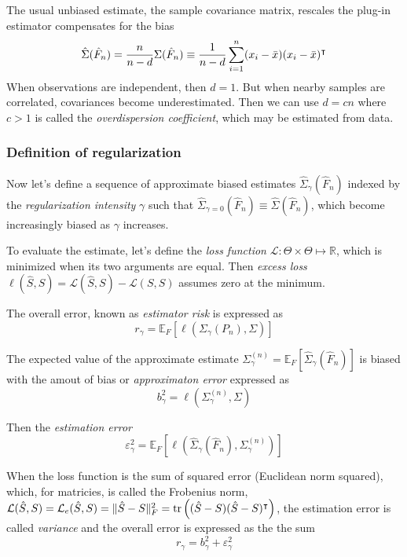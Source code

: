The usual unbiased estimate, the sample covariance matrix, rescales the plug-in estimator compensates for the bias
\begin{equation}
\hat\Sigma(\hat F_n) = \frac n {n - d} \Sigma(\hat F_n) \equiv \frac 1 {n-d} \sum\limits_{i=1}^n (x_i - \bar x) (x_i - \bar x)^\intercal
\end{equation}
When observations are independent, then $d=1$.  But when nearby samples are correlated, covariances become underestimated. Then we can use $d=cn$ where $c>1$ is called the \emph{overdispersion coefficient}, which may be estimated from data.

\subsubsection{Definition of regularization}
Now let's define a sequence of approximate biased estimates $\hat\Sigma_\gamma(\hat F_n)$ indexed by the \emph{regularization intensity}  $\gamma$ such that $\hat\Sigma_{\gamma=0}(\hat F_n)\equiv \hat\Sigma(\hat F_n)$, which become increasingly biased as $\gamma$ increases.

To evaluate the estimate, let's define the \emph{loss function} $\mathcal L : \Theta \times \Theta \mapsto \mathbb R$, which is minimized when its two arguments are equal.  Then \emph{excess loss} $\ell(\hat S, S) = \mathcal L(\hat S, S) - \mathcal L(S,S)$ assumes zero at the minimum.

The overall error, known as \emph{estimator risk} is expressed as
\begin{equation}
r_\gamma = \mathbb E_F\left[ \ell\left(\Sigma_\gamma(P_n),\Sigma\right) \right]
\end{equation}

The expected value of the approximate estimate 
$\Sigma_\gamma^{(n)} = \mathbb E_F\left[\hat \Sigma_\gamma(\hat F_n)\right]$ 
is biased with the amout of bias or \emph{approximaton error} expressed as  
\begin{equation}
b_\gamma^2 = \ell \left( \Sigma_\gamma^{(n)},\Sigma\right)
\end{equation}

Then the \emph{estimation error} 
\begin{equation}
\varepsilon_\gamma^2 = \mathbb E_F \left[ \ell\left(\hat \Sigma_\gamma(\hat F_n), \Sigma_\gamma^{(n)}\right) \right]
\end{equation}

When the loss function is the sum of squared error (Euclidean norm squared), which, for matricies, is called the Frobenius norm, $\mathcal L(\hat S,S) = \mathcal L_e(\hat S,S) = \|\hat S-S\|_F^2 = \operatorname{tr}\left((\hat S-S)(\hat S-S)^\intercal\right)$, the estimation error is called \emph{variance} and the overall error is expressed as the the sum 
\begin{equation}
r_\gamma =  b_\gamma^2 + \varepsilon_\gamma^2
\end{equation}

